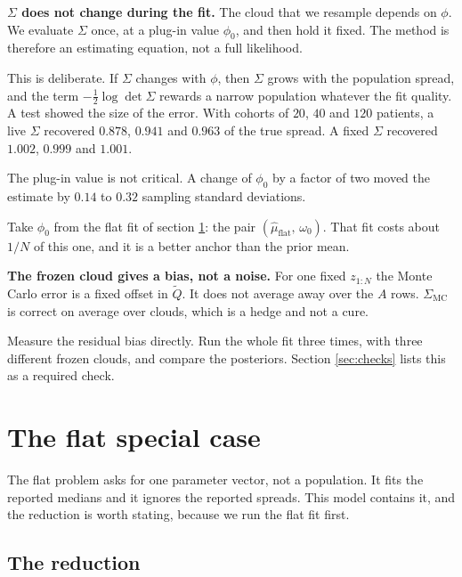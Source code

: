 \documentclass[11pt]{article}
\begin{document}
\begin{assumpbox}
\textbf{$\Sigma$ does not change during the fit.} The cloud that we resample
depends on $\phi$. We evaluate $\Sigma$ once, at a plug-in value $\phi_0$, and
then hold it fixed. The method is therefore an estimating equation, not a full
likelihood.

This is deliberate. If $\Sigma$ changes with $\phi$, then $\Sigma$ grows with the
population spread, and the term $-\tfrac12\log\det\Sigma$ rewards a narrow
population whatever the fit quality. A test showed the size of the error. With
cohorts of $20$, $40$ and $120$ patients, a live $\Sigma$ recovered $0.878$,
$0.941$ and $0.963$ of the true spread. A fixed $\Sigma$ recovered $1.002$,
$0.999$ and $1.001$.

The plug-in value is not critical. A change of $\phi_0$ by a factor of two moved
the estimate by $0.14$ to $0.32$ sampling standard deviations.

Take $\phi_0$ from the flat fit of section \ref{sec:flat}: the pair
$(\hat\mu_{\text{flat}},\,\omega_0)$. That fit costs about $1/N$ of this one, and
it is a better anchor than the prior mean.
\end{assumpbox}

\begin{assumpbox}
\textbf{The frozen cloud gives a bias, not a noise.} For one fixed $z_{1:N}$ the
Monte Carlo error is a fixed offset in $\widetilde Q$. It does not average away
over the $A$ rows. $\Sigma_{\text{MC}}$ is correct on average over clouds, which
is a hedge and not a cure.

Measure the residual bias directly. Run the whole fit three times, with three
different frozen clouds, and compare the posteriors. Section \ref{sec:checks}
lists this as a required check.
\end{assumpbox}

\section{The flat special case}
\label{sec:flat}

The flat problem asks for one parameter vector, not a population. It fits the
reported medians and it ignores the reported spreads. This model contains it,
and the reduction is worth stating, because we run the flat fit first.

\subsection{The reduction}
\end{document}
